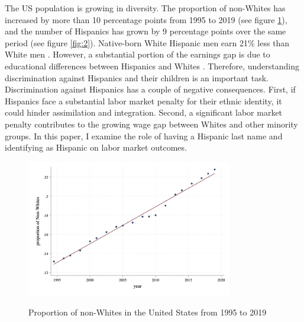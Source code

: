 \documentclass[12pt, fullpage]{article}
\begin{document}
The US population is growing in diversity. The proportion of non-Whites has increased by more than 10 percentage points from 1995 to 2019 (see figure \ref{fig:1}), and the number of Hispanics has grown by 9 percentage points over the same period (see figure \ref{fig:2}). Native-born White Hispanic men earn 21\% less than White men \citep{duncan2018identifying}. However, a substantial portion of the earnings gap is due to educational differences between Hispanics and Whites \citep{duncan2006hispanics, duncan2018socioeconomic}. Therefore, understanding discrimination against Hispanics and their children is an important task. Discrimination against Hispanics has a couple of negative consequences. First, if Hispanics face a substantial labor market penalty for their ethnic identity, it could hinder assimilation and integration. Second, a significant labor market penalty contributes to the growing wage gap between Whites and other minority groups. In this paper, I examine the role of having a Hispanic last name and identifying as Hispanic on labor market outcomes. 

\begin{figure}[H]
\begin{center}
\caption{Proportion of non-Whites in the United States from 1995 to 2019}
\includegraphics[width=0.8\textwidth]{GraphNonWhites.png} 
\label{fig:1}
\end{center}
\end{figure}
\end{document}
